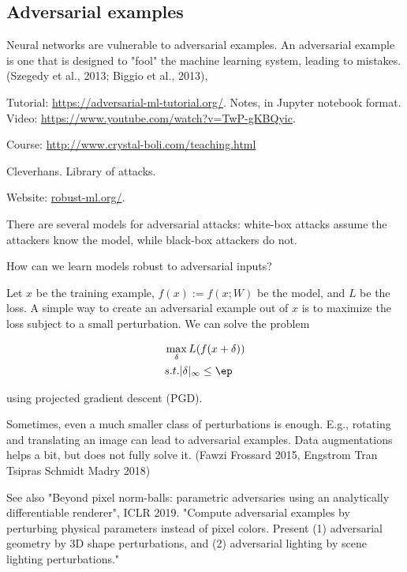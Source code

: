 \documentclass[english]{article}
\begin{document}
\subsection{Adversarial examples}
%
\bitem
\item Neural networks are vulnerable to adversarial examples. An adversarial example is one that is designed to "fool" the machine learning system, leading to mistakes. (Szegedy et al., 2013; Biggio et al., 2013),

Tutorial: \url{https://adversarial-ml-tutorial.org/}. Notes, in Jupyter notebook format. Video: \url{https://www.youtube.com/watch?v=TwP-gKBQyic}.

Course: \url{http://www.crystal-boli.com/teaching.html}


Cleverhans. Library of attacks. 

Website: \url{robust-ml.org/}.


\item There are several models for adversarial attacks: white-box attacks assume the attackers know the model, while black-box attackers do not. 

\item How can we learn models robust to adversarial inputs?

\item Let $x$ be the training example, $f(x ):=f(x;W)$ be the model, and  $L$ be the loss. A simple way to create an adversarial example out of $x$ is to maximize the loss subject to a small perturbation. We can solve the problem 

\begin{align*}
&\max_\delta L(f(x+\delta))\\
&s.t. |\delta|_\infty \le \ep
\end{align*}

using projected gradient descent (PGD).

\item Sometimes, even a much smaller class of perturbations is enough. E.g., rotating and translating an image can lead to adversarial examples. Data augmentations helps a bit, but does not fully solve it. (Fawzi Frossard 2015, Engstrom Tran Tsipras Schmidt Madry 2018) 

See also "Beyond pixel norm-balls: parametric adversaries using an analytically differentiable renderer", ICLR 2019. "Compute adversarial examples by perturbing physical parameters instead of pixel colors. Present (1) adversarial geometry by 3D shape perturbations, and (2) adversarial lighting by scene lighting perturbations."
\end{document}

